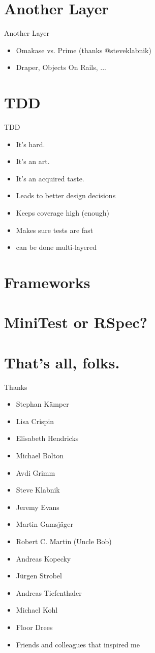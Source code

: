 \documentclass[style=paintings,display=slidesnotes,clock]{powerdot}
\begin{document}
\section{Another Layer}
\begin{note}{Another Layer}
	\begin{itemize}
		\item Omakase vs. Prime (thanks @steveklabnik)
		\item Draper, Objects On Rails, ...
	\end{itemize}
\end{note}
\section{TDD}
\begin{note}{TDD}
	\begin{itemize}
		\item It's hard.
		\item It's an art.
		\item It's an acquired taste.
		\item Leads to better design decisions
		\item Keeps coverage high (enough)
		\item Makes sure tests are fast
		\item can be done multi-layered
	\end{itemize}
\end{note}
\section{ Frameworks }
\section{ MiniTest or RSpec? }
\section{ That's all, folks. }
\begin{slide}{Thanks}
	\begin{itemize}
		\item Stephan Kämper
		\item Lisa Crispin
		\item Elisabeth Hendricks
		\item Michael Bolton
		\item Avdi Grimm
		\item Steve Klabnik
		\item Jeremy Evans
		\item Martin Gamsjäger
		\item Robert C. Martin (Uncle Bob)
		\item Andreas Kopecky
		\item Jürgen Strobel
		\item Andreas Tiefenthaler
		\item Michael Kohl
		\item Floor Drees
		\item Friends and colleagues that inspired me
	\end{itemize}
\end{slide}
\end{document}
